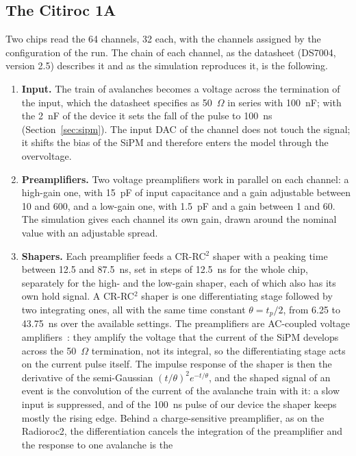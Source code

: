 \documentclass[11pt]{article}
\begin{document}
\subsection{The Citiroc 1A}
\label{sec:citiroc}

Two chips read the 64 channels, 32 each, with the channels assigned by the
configuration of the run. The chain of each channel, as the datasheet (DS7004,
version 2.5) describes it and as the simulation reproduces it, is the
following.

\begin{enumerate}
\item {\bf Input.} The train of avalanches becomes a voltage across the
  termination of the input, which the datasheet specifies as 50~$\Omega$ in
  series with 100~nF; with the 2~nF of the device it sets the fall of the
  pulse to 100~ns (Section~\ref{sec:sipm}). The input DAC of the channel
  does not touch the signal; it shifts the bias of the SiPM and therefore
  enters the model through the overvoltage.
\item {\bf Preamplifiers.} Two voltage preamplifiers work in parallel on each
  channel: a high-gain one, with 15~pF of input capacitance and a gain
  adjustable between 10 and 600, and a low-gain one, with 1.5~pF and a gain
  between 1 and 60. The simulation gives each channel its own gain, drawn
  around the nominal value with an adjustable spread.
\item {\bf Shapers.} Each preamplifier feeds a CR-RC$^2$ shaper with a
  peaking time between 12.5 and 87.5~ns, set in steps of 12.5~ns for the
  whole chip, separately for the high- and the low-gain shaper, each of
  which also has its own hold signal. A CR-RC$^2$ shaper is one differentiating stage followed by
  two integrating ones, all with the same time constant $\theta = t_p/2$,
  from 6.25 to 43.75~ns over the available settings. The preamplifiers are
  AC-coupled voltage amplifiers~\cite{citiroc}: they amplify the voltage
  that the current of the SiPM develops across the 50~$\Omega$ termination,
  not its integral, so the differentiating stage acts on the current pulse
  itself. The impulse response of the shaper is then the derivative of the
  semi-Gaussian $(t/\theta)^2 e^{-t/\theta}$, and the shaped signal of an
  event is the convolution of the current of the avalanche train with it:
  a slow input is suppressed, and of the 100~ns pulse of our device the
  shaper keeps mostly the rising edge. Behind a charge-sensitive
  preamplifier, as on the Radioroc2, the differentiation cancels the
  integration of the preamplifier and the response to one avalanche is the

\end{enumerate}
\end{document}
